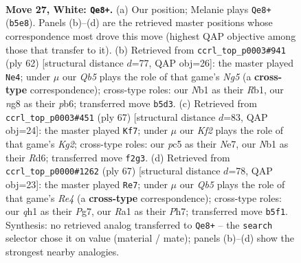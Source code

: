 \documentclass[11pt]{article}
\begin{document}
\clearpage

\begin{figure}[p]\centering
\begin{subfigure}{0.46\textwidth}\centering
\resizebox{\linewidth}{!}{%
\newchessgame
\chessboard[
  setfen={2k3nr/2r3p1/8/1Qp3Pp/5P1P/2P5/PP3K2/RNB4q w - - 3 27},
  showmover=false,
  pgfstyle=straightmove, color=movearrow, markmove={b5-e8}
]}
\caption{}
\end{subfigure}\hfill
\begin{subfigure}{0.46\textwidth}\centering
\resizebox{\linewidth}{!}{%
\newchessgame
\chessboard[
  setfen={3r2k1/2r2pp1/pp1pp3/6N1/1PP5/P6P/5P1K/1R3B2 w - - 5 32},
  showmover=false,
  pgfstyle=straightmove, color=movearrow, markmove={g5-e4}
]}
\caption{}
\end{subfigure}
\\[4pt]
\begin{subfigure}{0.46\textwidth}\centering
\resizebox{\linewidth}{!}{%
\newchessgame
\chessboard[
  setfen={8/2r1n1kp/1p1r2p1/p2p4/5PP1/P3R3/1P4BP/1K2R3 b - - 3 34},
  showmover=false,
  pgfstyle=straightmove, color=movearrow, markmove={g7-f7}
]}
\caption{}
\end{subfigure}\hfill
\begin{subfigure}{0.46\textwidth}\centering
\resizebox{\linewidth}{!}{%
\newchessgame
\chessboard[
  setfen={5k2/p4ppp/1p6/1Pp1rP2/4n3/4PR1P/6P1/R5K1 b - - 2 34},
  showmover=false,
  pgfstyle=straightmove, color=movearrow, markmove={e5-e7}
]}
\caption{}
\end{subfigure}
\caption{\textbf{Move 27, White: \texttt{Qe8+}.} (a) Our position; Melanie plays \texttt{Qe8+} (\texttt{b5e8}). Panels (b)--(d) are the retrieved master positions whose correspondence most drove this move (highest QAP objective among those that transfer to it). (b) Retrieved from \texttt{ccrl\_top\_p0003\#941} (ply 62) [structural distance $d$=77, QAP obj=26]: the master played \texttt{Ne4}; under $\mu$ our \emph{Qb5} plays the role of that game's \emph{Ng5} (a \textbf{cross-type} correspondence); cross-type roles: our \emph{N}b1 as their \emph{R}b1, our \emph{n}g8 as their \emph{p}b6; transferred move \texttt{b5d3}. (c) Retrieved from \texttt{ccrl\_top\_p0003\#451} (ply 67) [structural distance $d$=83, QAP obj=24]: the master played \texttt{Kf7}; under $\mu$ our \emph{Kf2} plays the role of that game's \emph{Kg2}; cross-type roles: our \emph{p}c5 as their \emph{N}e7, our \emph{N}b1 as their \emph{R}d6; transferred move \texttt{f2g3}. (d) Retrieved from \texttt{ccrl\_top\_p0000\#1262} (ply 67) [structural distance $d$=78, QAP obj=23]: the master played \texttt{Re7}; under $\mu$ our \emph{Qb5} plays the role of that game's \emph{Re4} (a \textbf{cross-type} correspondence); cross-type roles: our \emph{q}h1 as their \emph{P}g7, our \emph{R}a1 as their \emph{P}h7; transferred move \texttt{b5f1}. Synthesis: no retrieved analog transferred to \texttt{Qe8+} -- the \texttt{search} selector chose it on value (material / mate); panels (b)--(d) show the strongest nearby analogies.}
\label{fig:thought-m52}
\end{figure}
\end{document}

